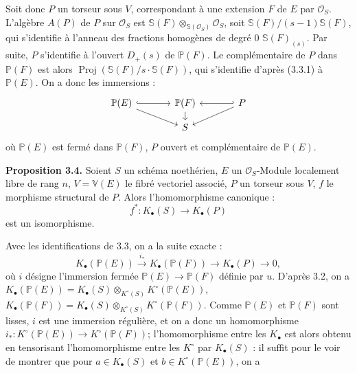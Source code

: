 Soit donc $P$ un torseur sous $V$, correspondant à une extension $F$ de $E$ par $\mathcal O_S$. L'algèbre $A(P)$ de $P$ sur $\mathcal O_S$ est $\mathbb S(F)\otimes_{\mathbb S(\mathcal O_S)}\mathcal O_S$, soit $\mathbb S(F)/(s-1)\mathbb S(F)$, qui s'identifie à l'anneau des fractions homogènes de degré $0$ $\mathbb S(F)_{(s)}$. Par suite, $P$ s'identifie à l'ouvert $D_+(s)$ de $\mathbb P(F)$. Le complémentaire de $P$ dans $\mathbb P(F)$ est alors $\operatorname{Proj}(\mathbb S(F)/s\cdot \mathbb S(F))$, qui s'identifie d'après (3.3.1) à $\mathbb P(E)$. On a donc les immersions :
\[
\begin{tikzcd}[column sep=large,row sep=small]
\mathbb P(E) \arrow[r,hook] \arrow[dr] & \mathbb P(F) \arrow[d] & P \arrow[l,hook'] \arrow[dl]\\
& S &
\end{tikzcd}
\]
où $\mathbb P(E)$ est fermé dans $\mathbb P(F)$, $P$ ouvert et complémentaire de $\mathbb P(E)$.

\textbf{Proposition 3.4.} Soient $S$ un schéma noethérien, $E$ un $\mathcal O_S$-Module localement libre de rang $n$, $V=\mathbb V(E)$ le fibré vectoriel associé, $P$ un torseur sous $V$, $f$ le morphisme structural de $P$. Alors l'homomorphisme canonique :
\[
f^*:K_\bullet(S)\longrightarrow K_\bullet(P)
\]
est un isomorphisme.

Avec les identifications de 3.3, on a la suite exacte :
\[
K_\bullet(\mathbb P(E))\xrightarrow{i_*}K_\bullet(\mathbb P(F))\longrightarrow K_\bullet(P)\longrightarrow 0,
\tag{3.4.1}
\]
où $i$ désigne l'immersion fermée $\mathbb P(E)\to \mathbb P(F)$ définie par $u$. D'après 3.2, on a $K_\bullet(\mathbb P(E))=K_\bullet(S)\otimes_{K^\circ(S)}K^\circ(\mathbb P(E))$, $K_\bullet(\mathbb P(F))=K_\bullet(S)\otimes_{K^\circ(S)}K^\circ(\mathbb P(F))$.
Comme $\mathbb P(E)$ et $\mathbb P(F)$ sont lisses, $i$ est une immersion régulière, et on a donc un homomorphisme $i_*:K^\circ(\mathbb P(E))\to K^\circ(\mathbb P(F))$; l'homomorphisme entre les $K_\bullet$ est alors obtenu en tensorisant l'homomorphisme entre les $K^\circ$ par $K_\bullet(S)$ : il suffit pour le voir de montrer que pour $a\in K_\bullet(S)$ et $b\in K^\circ(\mathbb P(E))$, on a
